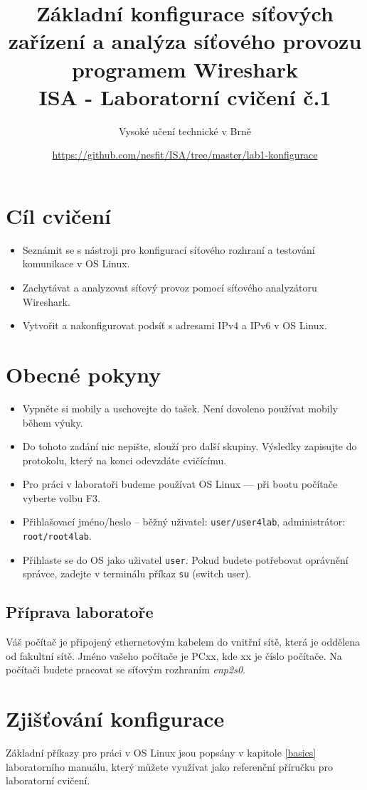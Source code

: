 \documentclass[a4paper,11pt]{article}
\title{Základní konfigurace síťových zařízení a analýza síťového provozu programem Wireshark\\
{\bf\large ISA - Laboratorní cvičení č.1}}
\author{Vysoké učení technické v Brně}
\date{\url{https://github.com/nesfit/ISA/tree/master/lab1-konfigurace}}
\begin{document}
{\let\newpage\relax\maketitle}

\section*{Cíl cvičení}
\begin{itemize}
  \item Seznámit se s nástroji pro konfigurací síťového rozhraní a testování komunikace v OS Linux.
  \item Zachytávat a analyzovat síťový provoz pomocí síťového analyzátoru Wireshark.
  \item Vytvořit a nakonfigurovat podsíť s adresami IPv4 a IPv6 v OS Linux.
\end{itemize}

\section*{Obecné pokyny}
\begin{itemize}
  \item Vypněte si mobily a uschovejte do tašek. Není dovoleno používat mobily během výuky. 
  \item Do tohoto zadání nic nepište, slouží pro další skupiny. Výsledky zapisujte do protokolu, který na konci odevzdáte cvičícímu. 
  \item Pro práci v laboratoři budeme používat OS Linux --- při bootu počítače vyberte volbu F3.
  \item Přihlašovací jméno/heslo -- běžný uživatel: \texttt{user/user4lab}, administrátor: \texttt{root/root4lab}.
  \item Přihlaste se do OS jako uživatel \texttt{user}. Pokud budete potřebovat oprávnění správce, zadejte v terminálu příkaz {\tt su} (switch user).
\end{itemize}

\subsection*{Příprava laboratoře}
Váš počítač je připojený ethernetovým kabelem do vnitřní sítě, která je oddělena od fakultní sítě. Jméno vašeho počítače je PCxx, kde xx je číslo počítače. Na počítači budete pracovat se síťovým rozhraním {\em enp2s0}.

\section{Zjišťování konfigurace}
Základní příkazy pro práci v OS Linux jsou popsány v kapitole \ref{basics} laboratorního manuálu, který můžete využívat jako referenční příručku pro laboratorní cvičení.
\end{document}
